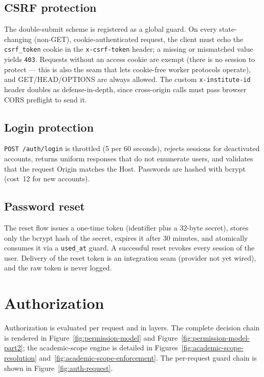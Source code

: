 \subsection{CSRF protection}

\noindent The double-submit scheme is registered as a global guard. On every
state-changing (non-GET), cookie-authenticated request, the client must echo
the \texttt{csrf\_token} cookie in the \texttt{x-csrf-token} header; a
missing or mismatched value yields \texttt{403}. Requests without an access
cookie are exempt (there is no session to protect --- this is also the seam
that lets cookie-free worker protocols operate), and GET/HEAD/OPTIONS are
always allowed. The custom \texttt{x-institute-id} header doubles as
defense-in-depth, since cross-origin calls must pass browser CORS
preflight to send it.

\subsection{Login protection}

\noindent \texttt{POST /auth/login} is throttled (5 per 60 seconds), rejects
sessions for deactivated accounts, returns uniform responses that do not
enumerate users, and validates that the request Origin matches the Host.
Passwords are hashed with bcrypt (cost~12 for new accounts).

\subsection{Password reset}

\noindent The reset flow issues a one-time token (identifier plus a 32-byte
secret), stores only the bcrypt hash of the secret, expires it after 30
minutes, and atomically consumes it via a \texttt{used\_at} guard. A
successful reset revokes every session of the user. Delivery of the reset
token is an integration seam (provider not yet wired), and the raw token is
never logged.

\section{Authorization}

\noindent Authorization is evaluated per request and in layers. The complete
decision chain is rendered in Figure~\ref{fig:permission-model} and
Figure~\ref{fig:permission-model-part2};
the academic-scope engine is detailed in Figures~\ref{fig:academic-scope-resolution}
and~\ref{fig:academic-scope-enforcement}. The per-request guard chain is shown
in Figure~\ref{fig:auth-request}.


